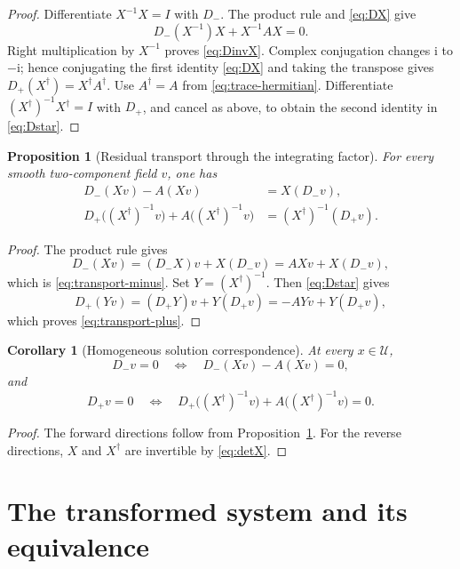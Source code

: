 \documentclass[11pt,a4paper]{article}
\numberwithin{equation}{section}
\newtheorem{proposition}[theorem]{Proposition}
\newtheorem{corollary}[theorem]{Corollary}
\theoremstyle{definition}
\theoremstyle{remark}
\newcommand{\I}{\mathrm i}
\newcommand{\Uext}{\mathcal U}
\begin{document}
\begin{proof}
Differentiate \(X^{-1}X=I\) with \(D_-\).  The product rule and
\eqref{eq:DX} give
\[
 D_-(X^{-1})X+X^{-1}AX=0.
\]
Right multiplication by \(X^{-1}\) proves \eqref{eq:DinvX}.  Complex
conjugation changes \(\I\) to \(-\I\); hence conjugating the first
identity \eqref{eq:DX} and taking the transpose gives
\(D_+(X^\dagger)=X^\dagger A^\dagger\).
Use \(A^\dagger=A\) from \eqref{eq:trace-hermitian}.  Differentiate
\((X^\dagger)^{-1}X^\dagger=I\) with \(D_+\), and cancel as above, to
obtain the second identity in \eqref{eq:Dstar}.
\end{proof}

\begin{proposition}[Residual transport through the integrating factor]
\label{prop:transport}
For every smooth two-component field \(v\), one has
\begin{align}
 D_-(Xv)-A(Xv)&=X(D_-v),\label{eq:transport-minus}\\
 D_+\bigl((X^\dagger)^{-1}v\bigr)
 +A\bigl((X^\dagger)^{-1}v\bigr)
 &=(X^\dagger)^{-1}(D_+v).\label{eq:transport-plus}
\end{align}
\end{proposition}

\begin{proof}
The product rule gives
\[
 D_-(Xv)=(D_-X)v+X(D_-v)=AXv+X(D_-v),
\]
which is \eqref{eq:transport-minus}.  Set \(Y=(X^\dagger)^{-1}\).
Then \eqref{eq:Dstar} gives
\[
 D_+(Yv)=(D_+Y)v+Y(D_+v)=-AYv+Y(D_+v),
\]
which proves \eqref{eq:transport-plus}.
\end{proof}

\begin{corollary}[Homogeneous solution correspondence]
\label{cor:homogeneous}
At every \(x\in\Uext\),
\[
 D_-v=0\quad\Longleftrightarrow\quad D_-(Xv)-A(Xv)=0,
\]
and
\[
 D_+v=0\quad\Longleftrightarrow\quad
 D_+\bigl((X^\dagger)^{-1}v\bigr)
 +A\bigl((X^\dagger)^{-1}v\bigr)=0.
\]
\end{corollary}

\begin{proof}
The forward directions follow from Proposition~\ref{prop:transport}.
For the reverse directions, \(X\) and \(X^\dagger\) are invertible by
\eqref{eq:detX}.
\end{proof}

\section{The transformed system and its equivalence}
\label{sec:transformation}
\end{document}
